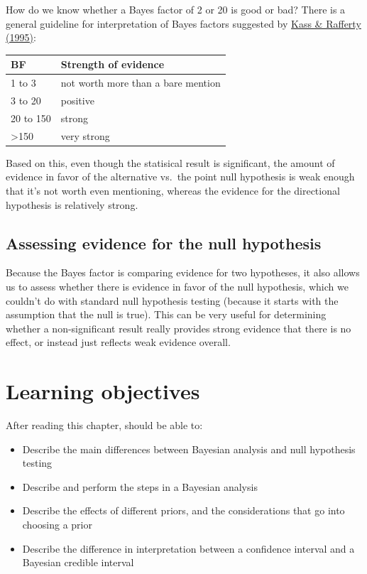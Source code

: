 \documentclass[12pt,]{book}
\providecommand{\tightlist}{%
  \setlength{\itemsep}{0pt}\setlength{\parskip}{0pt}}
\theoremstyle{definition}
\theoremstyle{definition}
\theoremstyle{definition}
\theoremstyle{remark}
\begin{document}
How do we know whether a Bayes factor of 2 or 20 is good or bad? There is a general guideline for interpretation of Bayes factors suggested by \href{https://www.andrew.cmu.edu/user/kk3n/simplicity/KassRaftery1995.pdf}{Kass \& Rafferty (1995)}:

\begin{longtable}[]{@{}ll@{}}
\toprule
BF & Strength of evidence\tabularnewline
\midrule
\endhead
1 to 3 & not worth more than a bare mention\tabularnewline
3 to 20 & positive\tabularnewline
20 to 150 & strong\tabularnewline
\textgreater{}150 & very strong\tabularnewline
\bottomrule
\end{longtable}

Based on this, even though the statisical result is significant, the amount of evidence in favor of the alternative vs.~the point null hypothesis is weak enough that it's not worth even mentioning, whereas the evidence for the directional hypothesis is relatively strong.

\hypertarget{assessing-evidence-for-the-null-hypothesis}{%
\subsection{Assessing evidence for the null hypothesis}\label{assessing-evidence-for-the-null-hypothesis}}

Because the Bayes factor is comparing evidence for two hypotheses, it also allows us to assess whether there is evidence in favor of the null hypothesis, which we couldn't do with standard null hypothesis testing (because it starts with the assumption that the null is true). This can be very useful for determining whether a non-significant result really provides strong evidence that there is no effect, or instead just reflects weak evidence overall.

\hypertarget{learning-objectives-10}{%
\section{Learning objectives}\label{learning-objectives-10}}

After reading this chapter, should be able to:

\begin{itemize}
\tightlist
\item
  Describe the main differences between Bayesian analysis and null hypothesis testing
\item
  Describe and perform the steps in a Bayesian analysis
\item
  Describe the effects of different priors, and the considerations that go into choosing a prior
\item
  Describe the difference in interpretation between a confidence interval and a Bayesian credible interval
\end{itemize}
\end{document}

